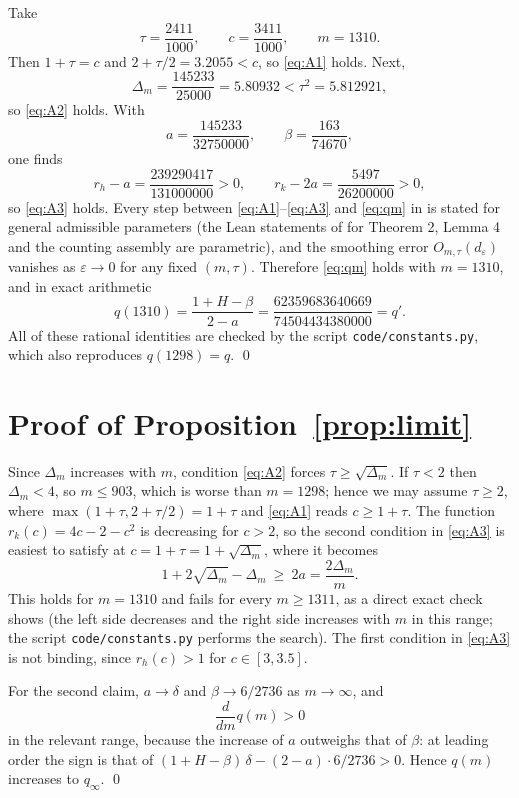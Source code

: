 \documentclass[reqno,11pt]{amsart}
\numberwithin{equation}{section}
\theoremstyle{plain}
\theoremstyle{remark}
\newcommand{\eps}{\varepsilon}
\begin{document}
Take
\[
\tau=\frac{2411}{1000},\qquad c=\frac{3411}{1000},\qquad m=1310 .
\]
Then $1+\tau=c$ and $2+\tau/2=3.2055<c$, so \eqref{eq:A1} holds.
Next,
\[
\Delta_m=\frac{145233}{25000}=5.80932<\tau^2=5.812921,
\]
so \eqref{eq:A2} holds. With
\[
a=\frac{145233}{32750000},\qquad \beta=\frac{163}{74670},
\]
one finds
\[
r_h-a=\frac{239290417}{131000000}>0,\qquad r_k-2a=\frac{5497}{26200000}>0,
\]
so \eqref{eq:A3} holds. Every step between \eqref{eq:A1}--\eqref{eq:A3} and
\eqref{eq:qm} in \cite{Kna26} is stated for general admissible parameters
(the Lean statements of \cite[\S4]{Kna26} for Theorem 2, Lemma 4 and the
counting assembly are parametric), and the smoothing error
$O_{m,\tau}(d_\eps)$ vanishes as $\eps\to0$ for any fixed $(m,\tau)$.
Therefore \eqref{eq:qm} holds with $m=1310$, and in exact arithmetic
\[
q(1310)=\frac{1+H-\beta}{2-a}=\frac{62359683640669}{74504434380000}=q'.
\]
All of these rational identities are checked by the script
\texttt{code/constants.py}, which also reproduces $q(1298)=q$. \qed

\section{Proof of Proposition~\ref{prop:limit}}

Since $\Delta_m$ increases with $m$, condition \eqref{eq:A2} forces
$\tau\ge\sqrt{\Delta_m}$. If $\tau<2$ then $\Delta_m<4$, so $m\le 903$, which
is worse than $m=1298$; hence we may assume $\tau\ge2$, where
$\max(1+\tau,2+\tau/2)=1+\tau$ and \eqref{eq:A1} reads $c\ge1+\tau$. The
function $r_k(c)=4c-2-c^2$ is decreasing for $c>2$, so the second condition
in \eqref{eq:A3} is easiest to satisfy at $c=1+\tau=1+\sqrt{\Delta_m}$, where
it becomes
\[
1+2\sqrt{\Delta_m}-\Delta_m\ \ge\ 2a=\frac{2\Delta_m}{m}.
\]
This holds for $m=1310$ and fails for every $m\ge1311$, as a direct exact
check shows (the left side decreases and the right side increases with $m$
in this range; the script \texttt{code/constants.py} performs the search).
The first condition in \eqref{eq:A3} is not binding, since
$r_h(c)>1$ for $c\in[3,3.5]$.

For the second claim, $a\to\delta$ and $\beta\to6/2736$ as $m\to\infty$, and
\[
\frac{d}{dm}q(m)>0
\]
in the relevant range, because the increase of $a$ outweighs that of
$\beta$: at leading order the sign is that of
$(1+H-\beta)\,\delta-(2-a)\cdot 6/2736>0$. Hence $q(m)$ increases to
$q_\infty$. \qed
\end{document}
